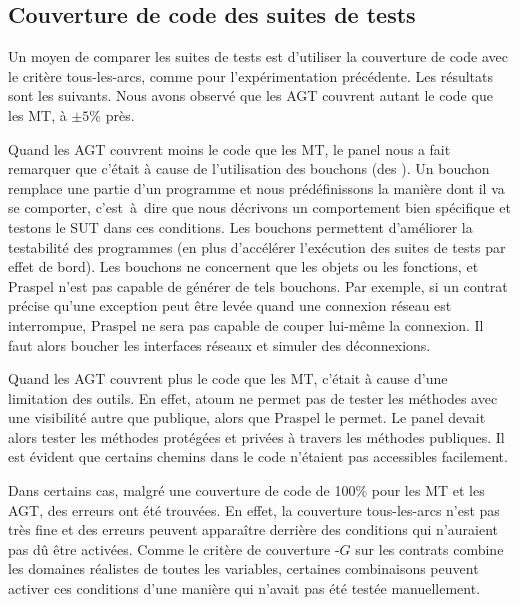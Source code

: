 
\subsection{Couverture de code des suites de tests}
\label{subsection:experimentation:coverage}


Un moyen de comparer les suites de tests est d'utiliser la couverture de code
avec le critère tous-les-arcs, comme pour l'expérimentation précédente.  Les
résultats sont les suivants. Nous avons observé que les AGT couvrent autant le
code que les MT, à $\pm 5\%$ près.

Quand les AGT couvrent moins le code que les MT, le panel nous a fait remarquer
que c'était à cause de l'utilisation des bouchons (des ). Un
bouchon remplace une partie d'un programme et nous prédéfinissons la manière
dont il va se comporter, c'est~à~dire que nous décrivons un comportement bien
spécifique et testons le SUT dans ces conditions. Les bouchons permettent
d'améliorer la testabilité des programmes (en plus d'accélérer l'exécution des
suites de tests par effet de bord). Les bouchons ne concernent que les objets ou
les fonctions, et Praspel n'est pas capable de générer de tels bouchons. Par
exemple, si un contrat précise qu'une exception peut être levée quand une
connexion réseau est interrompue, Praspel ne sera pas capable de couper lui-même
la connexion. Il faut alors boucher les interfaces réseaux et simuler des
déconnexions.

Quand les AGT couvrent plus le code que les MT, c'était à cause d'une limitation
des outils. En effet, atoum ne permet pas de tester les méthodes avec une
visibilité autre que publique, alors que Praspel le permet. Le panel devait
alors tester les méthodes protégées et privées à travers les méthodes publiques.
Il est évident que certains chemins dans le code n'étaient pas accessibles
facilement.

Dans certains cas, malgré une couverture de code de 100\% pour les MT et les
AGT, des erreurs ont été trouvées. En effet, la couverture tous-les-arcs n'est
pas très fine et des erreurs peuvent apparaître derrière des conditions qui
n'auraient pas dû être activées. Comme le critère de couverture
-$G$ sur les contrats combine les domaines réalistes de toutes
les variables, certaines combinaisons peuvent activer ces conditions d'une
manière qui n'avait pas été testée manuellement.

